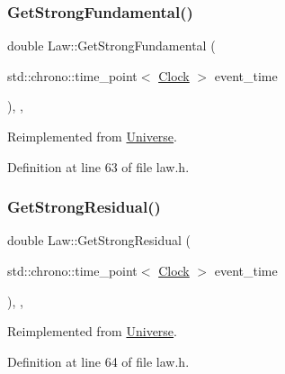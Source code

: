 \mbox{\label{class_law_afcdbea76524e5a52691fff7b526971e9}} 
\subsubsection{\texorpdfstring{Get\+Strong\+Fundamental()}{GetStrongFundamental()}}
{\footnotesize\ttfamily double Law\+::\+Get\+Strong\+Fundamental (\begin{DoxyParamCaption}\item[{std\+::chrono\+::time\+\_\+point$<$ \mbox{\hyperlink{universe_8h_a0ef8d951d1ca5ab3cfaf7ab4c7a6fd80}{Clock}} $>$}]{event\+\_\+time }\end{DoxyParamCaption})\hspace{0.3cm}{\ttfamily [inline]}, {\ttfamily [final]}, {\ttfamily [virtual]}}



Reimplemented from \mbox{\hyperlink{class_universe_ab44daccba01ee7e3cf9b50bba83dd19e}{Universe}}.



Definition at line 63 of file law.\+h.

\mbox{\label{class_law_a70fb2a7710776c4e2315a1e29fe35eb6}} 
\subsubsection{\texorpdfstring{Get\+Strong\+Residual()}{GetStrongResidual()}}
{\footnotesize\ttfamily double Law\+::\+Get\+Strong\+Residual (\begin{DoxyParamCaption}\item[{std\+::chrono\+::time\+\_\+point$<$ \mbox{\hyperlink{universe_8h_a0ef8d951d1ca5ab3cfaf7ab4c7a6fd80}{Clock}} $>$}]{event\+\_\+time }\end{DoxyParamCaption})\hspace{0.3cm}{\ttfamily [inline]}, {\ttfamily [final]}, {\ttfamily [virtual]}}



Reimplemented from \mbox{\hyperlink{class_universe_af0f4b81950061e63c2855eb40957a5b1}{Universe}}.



Definition at line 64 of file law.\+h.

